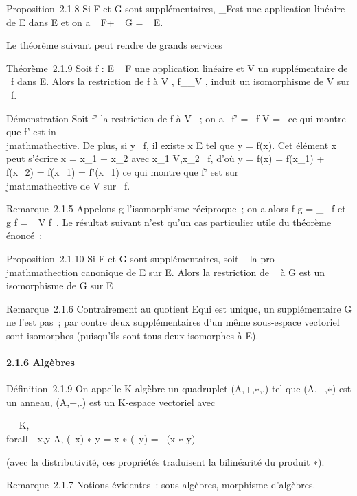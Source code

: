 Proposition~2.1.8 Si F et G sont supplémentaires, \pi_F\parallelG est une
application linéaire de E dans E et on a \pi_F\parallelG + \pi_G\parallelF
= \mathrmId_E.

Le théorème suivant peut rendre de grands services

Théorème~2.1.9 Soit f : E \rightarrow~ F une application linéaire et V un
supplémentaire de
\mathrmKer~f dans E. Alors
la restriction de f à V , f__V , induit un
isomorphisme de V sur
\mathrmIm~f.

Démonstration Soit f' la restriction de f à V ~; on a
\mathrmKer~f'
= \mathrmKer~f \bigcap V =
\0\ ce qui montre que f' est
in\\jmathmathective. De plus, si y
\in\mathrmIm~f, il existe x \in
E tel que y = f(x). Cet élément x peut s'écrire x = x_1 +
x_2 avec x_1 \in V,x_2
\in\mathrmKer~f, d'où y = f(x)
= f(x_1) + f(x_2) = f(x_1) = f'(x_1)
ce qui montre que f' est sur\\jmathmathective de V sur
\mathrmIm~f.

Remarque~2.1.5 Appelons g l'isomorphisme réciproque~; on a alors f \cdot g
=
\mathrmId_\mathrmIm~
f et g \cdot f = \pi_V
\parallel\mathrmKer f~. Le
résultat suivant n'est qu'un cas particulier utile du théorème énoncé~:

Proposition~2.1.10 Si F et G sont supplémentaires, soit \pi~ la pro\\jmathmathection
canonique de E sur E\diagupF. Alors la restriction de \pi~ à G est un
isomorphisme de G sur E\diagupF

Remarque~2.1.6 Contrairement au quotient E\diagupF qui est unique, un
supplémentaire G ne l'est pas~; par contre deux supplémentaires d'un
même sous-espace vectoriel sont isomorphes (puisqu'ils sont tous deux
isomorphes à E\diagupF).

\paragraph{2.1.6 Algèbres}

Définition~2.1.9 On appelle K-algèbre un quadruplet (A,+,∗,.) tel que
(A,+,∗) est un anneau, (A,+,.) est un K-espace vectoriel avec

\forall~\lambda~ \in K, \\forall~~x,y \in A,
(\lambda~x) ∗ y = x ∗ (\lambda~y) = \lambda~(x ∗ y)

(avec la distributivité, ces propriétés traduisent la bilinéarité du
produit ∗).

Remarque~2.1.7 Notions évidentes~: sous-algèbres, morphisme d'algèbres.

